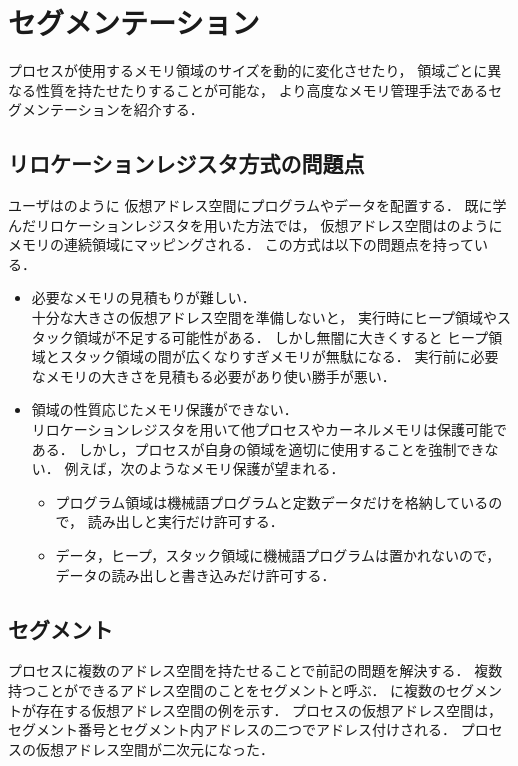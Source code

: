 \chapter{セグメンテーション}
プロセスが使用するメモリ領域のサイズを動的に変化させたり，
領域ごとに異なる性質を持たせたりすることが可能な，
より高度なメモリ管理手法であるセグメンテーションを紹介する．

\section{リロケーションレジスタ方式の問題点}
ユーザはのように
仮想アドレス空間にプログラムやデータを配置する．
既に学んだリロケーションレジスタを用いた方法では，
仮想アドレス空間はのように
メモリの連続領域にマッピングされる．
この方式は以下の問題点を持っている．

\begin{itemize}
\item 必要なメモリの見積もりが難しい．\\
十分な大きさの仮想アドレス空間を準備しないと，
実行時にヒープ領域やスタック領域が不足する可能性がある．
しかし無闇に大きくすると
ヒープ領域とスタック領域の間が広くなりすぎメモリが無駄になる．
実行前に必要なメモリの大きさを見積もる必要があり使い勝手が悪い．

\item 領域の性質応じたメモリ保護ができない．\\
リロケーションレジスタを用いて他プロセスやカーネルメモリは保護可能である．
しかし，プロセスが自身の領域を適切に使用することを強制できない．
例えば，次のようなメモリ保護が望まれる．

\begin{itemize}
\item プログラム領域は機械語プログラムと定数データだけを格納しているので，
読み出しと実行だけ許可する．
\item データ，ヒープ，スタック領域に機械語プログラムは置かれないので，
データの読み出しと書き込みだけ許可する．
\end{itemize}
\end{itemize}

\section{セグメント}
プロセスに複数のアドレス空間を持たせることで前記の問題を解決する．
複数持つことができるアドレス空間のことをセグメントと呼ぶ．
に複数のセグメントが存在する仮想アドレス空間の例を示す．
プロセスの仮想アドレス空間は，
セグメント番号とセグメント内アドレスの二つでアドレス付けされる．
プロセスの仮想アドレス空間が二次元になった．


